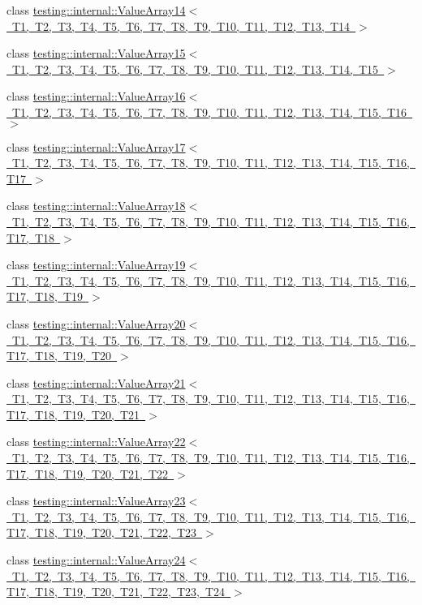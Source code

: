 \begin{DoxyCompactItemize}
\item 
class \mbox{\hyperlink{classtesting_1_1internal_1_1_value_array14}{testing\+::internal\+::\+Value\+Array14$<$ T1, T2, T3, T4, T5, T6, T7, T8, T9, T10, T11, T12, T13, T14 $>$}}
\item 
class \mbox{\hyperlink{classtesting_1_1internal_1_1_value_array15}{testing\+::internal\+::\+Value\+Array15$<$ T1, T2, T3, T4, T5, T6, T7, T8, T9, T10, T11, T12, T13, T14, T15 $>$}}
\item 
class \mbox{\hyperlink{classtesting_1_1internal_1_1_value_array16}{testing\+::internal\+::\+Value\+Array16$<$ T1, T2, T3, T4, T5, T6, T7, T8, T9, T10, T11, T12, T13, T14, T15, T16 $>$}}
\item 
class \mbox{\hyperlink{classtesting_1_1internal_1_1_value_array17}{testing\+::internal\+::\+Value\+Array17$<$ T1, T2, T3, T4, T5, T6, T7, T8, T9, T10, T11, T12, T13, T14, T15, T16, T17 $>$}}
\item 
class \mbox{\hyperlink{classtesting_1_1internal_1_1_value_array18}{testing\+::internal\+::\+Value\+Array18$<$ T1, T2, T3, T4, T5, T6, T7, T8, T9, T10, T11, T12, T13, T14, T15, T16, T17, T18 $>$}}
\item 
class \mbox{\hyperlink{classtesting_1_1internal_1_1_value_array19}{testing\+::internal\+::\+Value\+Array19$<$ T1, T2, T3, T4, T5, T6, T7, T8, T9, T10, T11, T12, T13, T14, T15, T16, T17, T18, T19 $>$}}
\item 
class \mbox{\hyperlink{classtesting_1_1internal_1_1_value_array20}{testing\+::internal\+::\+Value\+Array20$<$ T1, T2, T3, T4, T5, T6, T7, T8, T9, T10, T11, T12, T13, T14, T15, T16, T17, T18, T19, T20 $>$}}
\item 
class \mbox{\hyperlink{classtesting_1_1internal_1_1_value_array21}{testing\+::internal\+::\+Value\+Array21$<$ T1, T2, T3, T4, T5, T6, T7, T8, T9, T10, T11, T12, T13, T14, T15, T16, T17, T18, T19, T20, T21 $>$}}
\item 
class \mbox{\hyperlink{classtesting_1_1internal_1_1_value_array22}{testing\+::internal\+::\+Value\+Array22$<$ T1, T2, T3, T4, T5, T6, T7, T8, T9, T10, T11, T12, T13, T14, T15, T16, T17, T18, T19, T20, T21, T22 $>$}}
\item 
class \mbox{\hyperlink{classtesting_1_1internal_1_1_value_array23}{testing\+::internal\+::\+Value\+Array23$<$ T1, T2, T3, T4, T5, T6, T7, T8, T9, T10, T11, T12, T13, T14, T15, T16, T17, T18, T19, T20, T21, T22, T23 $>$}}
\item 
class \mbox{\hyperlink{classtesting_1_1internal_1_1_value_array24}{testing\+::internal\+::\+Value\+Array24$<$ T1, T2, T3, T4, T5, T6, T7, T8, T9, T10, T11, T12, T13, T14, T15, T16, T17, T18, T19, T20, T21, T22, T23, T24 $>$}}

\end{DoxyCompactItemize}
